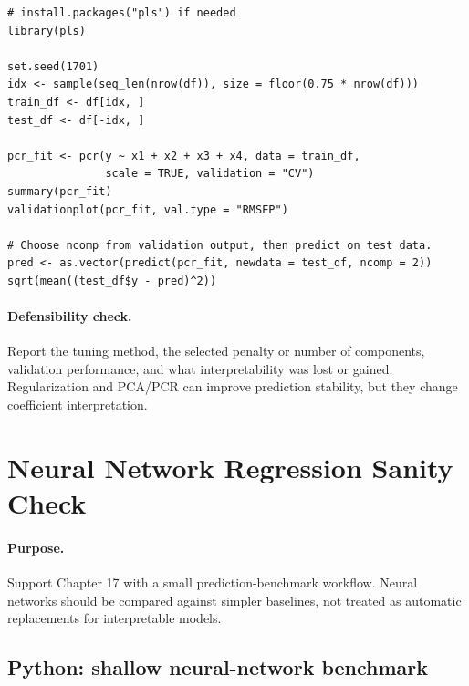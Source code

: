 \begin{verbatim}
# install.packages("pls") if needed
library(pls)

set.seed(1701)
idx <- sample(seq_len(nrow(df)), size = floor(0.75 * nrow(df)))
train_df <- df[idx, ]
test_df <- df[-idx, ]

pcr_fit <- pcr(y ~ x1 + x2 + x3 + x4, data = train_df,
               scale = TRUE, validation = "CV")
summary(pcr_fit)
validationplot(pcr_fit, val.type = "RMSEP")

# Choose ncomp from validation output, then predict on test data.
pred <- as.vector(predict(pcr_fit, newdata = test_df, ncomp = 2))
sqrt(mean((test_df$y - pred)^2))
\end{verbatim}

\paragraph{Defensibility check.} Report the tuning method, the selected penalty or number of components, validation performance, and what interpretability was lost or gained.  Regularization and PCA/PCR can improve prediction stability, but they change coefficient interpretation.

\section{Neural Network Regression Sanity Check}
\label{app:cookbook-neural-network-regression}

\paragraph{Purpose.} Support Chapter 17 with a small prediction-benchmark workflow.  Neural networks should be compared against simpler baselines, not treated as automatic replacements for interpretable models.

\subsection*{Python: shallow neural-network benchmark}

